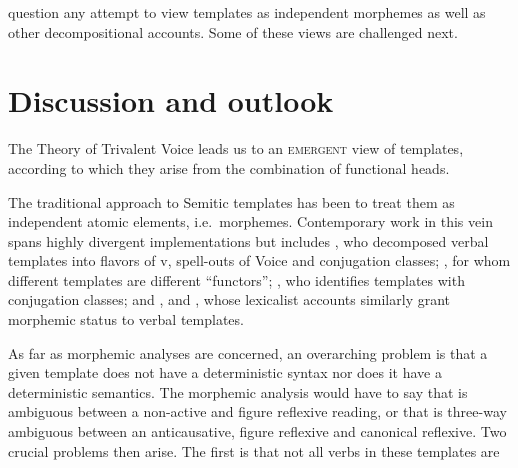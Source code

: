 \begin{exe}
\begin{xlist}
\begin{xlist}
\begin{exe}
\begin{xlist}
\begin{xlist}
\begin{exe}
\begin{xlist}
\begin{xlist}
\begin{exe}
\begin{exe}
\begin{xlist}
\begin{exe}
\begin{exe}
\begin{xlist}
\begin{exe}
\begin{exe}
\begin{exe}
\begin{exe}
\begin{exe}
\begin{xlist}
\begin{exe}
\begin{xlist}
\begin{exe}
\begin{exe}
\begin{xlist}
\begin{exe}
\begin{xlist}
\begin{exe}
\begin{xlist}
\begin{exe}
\begin{exe}
\begin{exe}
\begin{xlist}
\begin{exe}
\begin{exe}
\begin{exe}
\begin{xlist}
\begin{exe}
\begin{xlist}
\begin{exe}
\begin{exe}
\begin{xlist}
\begin{exe}
\begin{exe}
\begin{exe}
\begin{exe}
\begin{xlist}
\begin{exe}
\begin{xlist}
\begin{exe}
\begin{xlist}
\begin{exe}
\begin{xlist}
\begin{exe}
\begin{xlist}
\begin{exe}
\begin{xlist}
\begin{exe}
\begin{exe}
\begin{xlist}
\begin{exe}
\begin{xlist}
\begin{exe}
\begin{exe}
\begin{xlist}
\begin{exe}
\begin{xlist}
\begin{exe}
\begin{exe}
\begin{exe}
\begin{exe}
\begin{xlist}
\begin{xlist}
\begin{exe}
\begin{xlist}
\begin{exe}
\begin{exe}
\begin{exe}
\begin{xlist}
\begin{exe}
\begin{exe}
\begin{xlist}
\begin{exe}
\begin{exe}
\begin{exe}
\begin{xlist}
\begin{xlist}
\begin{exe}
\begin{xlist}
\begin{exe}
\begin{exe}
\begin{exe}
\begin{exe}
\begin{xlist}
\begin{exe}
\begin{xlist}
\begin{exe}
\begin{xlist}
\begin{exe}
\begin{xlist}
\begin{exe}
\begin{exe}
\begin{exe}
\begin{exe}
\begin{exe}
\begin{xlist}
\begin{exe}
\begin{xlist}
\begin{exe}
\begin{xlist}
\begin{xlist}
question any attempt to view templates as independent morphemes as well as other decompositional accounts. Some of these views are challenged next.

\section{Discussion and outlook} \label{vz:others}
The Theory of Trivalent Voice leads us to an \textsc{emergent} view of templates, according to which they arise from the combination of functional heads.

The traditional approach to Semitic templates has been to treat them as independent atomic elements, i.e.~morphemes. Contemporary work in this vein spans highly divergent implementations but includes \cite{arad03,arad05}, who decomposed verbal templates into flavors of v, spell-outs of Voice and conjugation classes; \cite{borer13oup}, for whom different templates are different ``functors''; \cite{aronoff94,aronoff07}, who identifies templates with conjugation classes; and \cite{reinhartsiloni05}, \cite{schwarzwald08} and \cite{laks11,laks14}, whose lexicalist accounts similarly grant morphemic status to verbal templates.

As far as morphemic analyses are concerned, an overarching problem is that a given template does not have a deterministic syntax nor does it have a deterministic semantics. The morphemic analysis would have to say that {\tnif} is ambiguous between a non-active and figure reflexive reading, or that {\thit} is three-way ambiguous between an anticausative, figure reflexive and canonical reflexive. Two crucial problems then arise. The first is that not all verbs in these templates are 
\end{xlist}
\end{xlist}
\end{exe}
\end{xlist}
\end{exe}
\end{xlist}
\end{exe}
\end{exe}
\end{exe}
\end{exe}
\end{exe}
\end{xlist}
\end{exe}
\end{xlist}
\end{exe}
\end{xlist}
\end{exe}
\end{xlist}
\end{exe}
\end{exe}
\end{exe}
\end{exe}
\end{xlist}
\end{exe}
\end{xlist}
\end{xlist}
\end{exe}
\end{exe}
\end{exe}
\end{xlist}
\end{exe}
\end{exe}
\end{xlist}
\end{exe}
\end{exe}
\end{exe}
\end{xlist}
\end{exe}
\end{xlist}
\end{xlist}
\end{exe}
\end{exe}
\end{exe}
\end{exe}
\end{xlist}
\end{exe}
\end{xlist}
\end{exe}
\end{exe}
\end{xlist}
\end{exe}
\end{xlist}
\end{exe}
\end{exe}
\end{xlist}
\end{exe}
\end{xlist}
\end{exe}
\end{xlist}
\end{exe}
\end{xlist}
\end{exe}
\end{xlist}
\end{exe}
\end{xlist}
\end{exe}
\end{exe}
\end{exe}
\end{exe}
\end{xlist}
\end{exe}
\end{exe}
\end{xlist}
\end{exe}
\end{xlist}
\end{exe}
\end{exe}
\end{exe}
\end{xlist}
\end{exe}
\end{exe}
\end{exe}
\end{xlist}
\end{exe}
\end{xlist}
\end{exe}
\end{xlist}
\end{exe}
\end{exe}
\end{xlist}
\end{exe}
\end{xlist}
\end{exe}
\end{exe}
\end{exe}
\end{exe}
\end{exe}
\end{xlist}
\end{exe}
\end{exe}
\end{xlist}
\end{exe}
\end{exe}
\end{xlist}
\end{xlist}
\end{exe}
\end{xlist}
\end{xlist}
\end{exe}
\end{xlist}
\end{xlist}
\end{exe}

